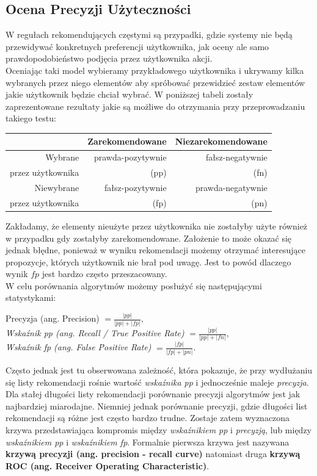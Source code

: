 \documentclass[12pt,a4paper]{report}
\begin{document}
\subsection{Ocena Precyzji Użyteczności}
W regułach rekomendujących częstymi są przypadki, gdzie systemy nie będą przewidywać konkretnych preferencji użytkownika, jak oceny ale samo prawdopodobieństwo podjęcia przez użytkownika akcji.
\\Oceniając taki model wybieramy przykładowego użytkownika i ukrywamy kilka wybranych przez niego elementów aby spróbować przewidzieć zestaw elementów jakie użytkownik będzie chciał wybrać. W poniższej tabeli zostały zaprezentowane rezultaty jakie są możliwe do otrzymania przy przeprowadzaniu takiego testu:
\begin{center}
\begin{tabular}{|r|r|r|} \hline
 & Zarekomendowane & Niezarekomendowane  \\
\hline 
Wybrane & prawda-pozytywnie & fałsz-negatywnie \\
przez użytkownika &(pp)&(fn) \\
\hline
Niewybrane & fałsz-pozytywnie & prawda-negatywnie \\
przez użytkownika &(fp)&(pn) \\
\hline
\end{tabular}
\end{center}
Zakładamy, że elementy nieużyte przez użytkownika nie zostałyby użyte również w przypadku gdy zostałyby zarekomendowane. Założenie to może okazać się jednak błędne, ponieważ w wyniku rekomendacji możemy otrzymać interesujące propozycje, których użytkownik nie brał pod uwagę. Jest to powód dlaczego wynik $fp$ jest bardzo często przeszacowany.
\\W celu porównania algorytmów możemy posłużyć się następującymi statystykami:
\begin{center}
Precyzja (ang. Precision) $= \frac{|pp|}{|pp|+|fp|}$, %
\\\textit{Wskaźnik pp (ang. Recall / True Positive Rate)} $ = \frac{|pp|}{|pp|+|fn|}$,
\\\textit{Wskaźnik fp (ang. False Positive Rate)} $ = \frac{|fp|}{|fp|+|pn|}$.
\end{center}
Często jednak jest tu obserwowana zależność, która pokazuje, że przy wydłużaniu się listy rekomendacji rośnie wartość \textit{wskaźnika pp} i jednocześnie maleje \textit{precyzja}. Dla stałej długości listy rekomendacji porównanie precyzji algorytmów jest jak najbardziej miarodajne. Niemniej jednak porównanie precyzji, gdzie długości list rekomendacji są różne jest często bardzo trudne. Zostaje zatem wyznaczona krzywa przedstawiająca kompromis między \textit{wskaźnikiem pp} i \textit{precyzją}, lub między \textit{wskaźnikiem pp} i \textit{wskaźnikiem fp}. Formalnie pierwsza krzywa jest nazywana \textbf{krzywą precyzji (ang. precision - recall curve)} natomiast druga \textbf{krzywą ROC (ang. Receiver Operating Characteristic)}.
\end{document}
